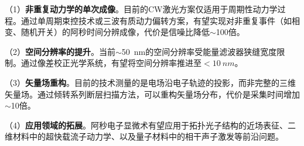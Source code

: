 （1）\textbf{非重复动力学的单次成像}。目前的CW激光方案仅适用于周期性动力学过程。通过单周期束控技术\cite{Baum2007}或三波有质动力偏转方案\cite{Morimoto2020}，有望实现对非重复事件（如相变、随机开关）的阿秒时间分辨成像，代价是信噪比降低$\sim$100倍。

（2）\textbf{空间分辨率的提升}。当前$\sim$\SI{50}{nm}的空间分辨率受能量滤波器狭缝宽度限制。通过像差校正光学系统\cite{Morimoto2018}，有望将空间分辨率推进至$<\SI{10}{nm}$。

（3）\textbf{矢量场重构}。目前的技术测量的是电场沿电子轨迹的投影，而非完整的三维矢量场。通过倾转系列断层扫描方法，可以重构矢量场分布，代价是采集时间增加$\sim$10倍。

（4）\textbf{应用领域的拓展}。阿秒电子显微术有望应用于拓扑光子结构的近场表征、二维材料中的超快载流子动力学、以及量子材料中的相干声子激发等前沿问题。
